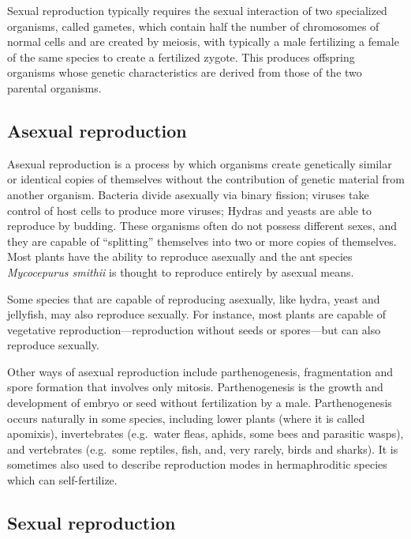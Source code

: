 Sexual reproduction typically requires the sexual interaction of two specialized organisms, called gametes, which contain half the number of chromosomes of normal cells and are created by meiosis, with typically a male fertilizing a female of the same species to create a fertilized zygote. This produces offspring organisms whose genetic characteristics are derived from those of the two parental organisms.

\hypertarget{asexual-reproduction}{%
\subsection{Asexual reproduction}\label{asexual-reproduction}}

Asexual reproduction is a process by which organisms create genetically similar or identical copies of themselves without the contribution of genetic material from another organism. Bacteria divide asexually via binary fission; viruses take control of host cells to produce more viruses; Hydras and yeasts are able to reproduce by budding. These organisms often do not possess different sexes, and they are capable of ``splitting'' themselves into two or more copies of themselves. Most plants have the ability to reproduce asexually and the ant species \emph{Mycocepurus smithii} is thought to reproduce entirely by asexual means.

Some species that are capable of reproducing asexually, like hydra, yeast and jellyfish, may also reproduce sexually. For instance, most plants are capable of vegetative reproduction---reproduction without seeds or spores---but can also reproduce sexually.

Other ways of asexual reproduction include parthenogenesis, fragmentation and spore formation that involves only mitosis. Parthenogenesis is the growth and development of embryo or seed without fertilization by a male. Parthenogenesis occurs naturally in some species, including lower plants (where it is called apomixis), invertebrates (e.g.~water fleas, aphids, some bees and parasitic wasps), and vertebrates (e.g.~some reptiles, fish, and, very rarely, birds and sharks). It is sometimes also used to describe reproduction modes in hermaphroditic species which can self-fertilize.

\hypertarget{sexual-reproduction}{%
\subsection{Sexual reproduction}\label{sexual-reproduction}}

